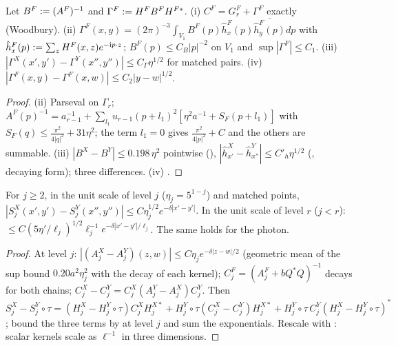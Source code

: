 \begin{lemma}\label{rot:lem:Gam}
Let $B^F:=(A^F)^{-1}$ and $\Gamma^F:= H^FB^FH^{F*}$. \textup{(i)} $C^F=G^F_r+\Gamma^F$ exactly (Woodbury). \textup{(ii)} $\Gamma^F(x,y)=(2\pi)^{-3}\int_{V_1}B^F(p)\hat h^F_x(p)\overline{\hat h^F_y(p)}dp$ with $\hat h^F_x(p):=\sum_zH^F(x,z)e^{-\mathrm ip\cdot z}$; $B^F(p)\le C_B|p|^{-2}$ on $V_1$ and $\sup|\Gamma^F|\le C_1$. \textup{(iii)} $|\Gamma^X(x',y')-\Gamma^Y(x'',y'')|\le C_\Gamma\eta^{1/2}$ for matched pairs. \textup{(iv)} $|\Gamma^F(x,y)-\Gamma^F(x,w)|\le C_2|y-w|^{1/2}$.
\end{lemma}
\begin{proof}
(ii) Parseval on $\Gamma_r$; $A^F(p)^{-1}=a_{r-1}^{-1}+\sum_{l_1}u_{r-1}(p+l_1)^2[\eta^2a^{-1}+S_F(p+l_1)]$ with $S_F(q)\le\frac{\pi^2}{4|q|^2}+31\eta^2$; the term $l_1=0$ gives $\frac{\pi^2}{4|p|^2}+C$ and the others are summable. (iii) $|B^X-B^Y|\le0.198\,\eta^2$ pointwise (), $|\hat h^X_{x'}-\hat h^Y_{x''}|\le C'_h\eta^{1/2}$ (, decaying form); three differences. (iv) .
\end{proof}

\begin{lemma}\label{rot:lem:slice}
For $j\ge2$, in the unit scale of level $j$ ($\eta_j=5^{1-j}$) and matched points, $|S^X_j(x',y')-S^Y_j(x'',y'')|\le C\eta_j^{1/2}e^{-\delta|x'-y'|}$. In the unit scale of level $r$ ($j<r$): $\le C(5\eta'/\ell_j)^{1/2}\ell_j^{-1}e^{-\delta|x'-y'|/\ell_j}$. The same holds for the photon.
\end{lemma}
\begin{proof}
At level $j$: $|(A^X_j-A^Y_j)(z,w)|\le C\eta_je^{-\delta|z-w|/2}$ (geometric mean of the sup bound $0.20a^2\eta_j^2$ with the decay of each kernel); $C^F_j=(A^F_j+bQ^*Q)^{-1}$ decays for both chains; $C^X_j-C^Y_j=C^X_j(A^Y_j-A^X_j)C^Y_j$. Then $S^X_j-S^Y_j\circ\tau=(H^X_j-H^Y_j\circ\tau)C^X_jH^{X*}_j+H^Y_j\circ\tau(C^X_j-C^Y_j)H^{X*}_j+H^Y_j\circ\tau\,C^Y_j(H^X_j-H^Y_j\circ\tau)^*$; bound the three terms by  at level $j$ and sum the exponentials. Rescale with \cite[(2.20)]{K1}: scalar kernels scale as $\ell^{-1}$ in three dimensions.
\end{proof}

